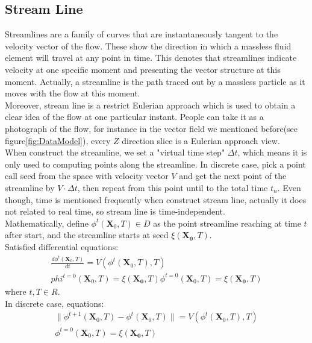 \documentclass[
     11pt,         %
     a4paper,      %
     oneside,
     ]{article}
\newcommand{\vect}[1]{\boldsymbol{#1}}
\begin{document}
	\subsection{Stream  Line}
	Streamlines are a family of curves that are instantaneously tangent to the velocity vector of the flow. These show the direction in which a massless fluid element will travel at any point in time\cite{StreamlineDefine}. This denotes that streamlines indicate velocity at one specific moment and presenting the vector structure at this moment. Actually, a streamline is the path traced out by a massless particle as it moves with the flow at this moment.\\
	Moreover, stream line is a restrict Eulerian approach which is used to obtain a clear idea of the flow at one particular instant. People can take it as a photograph of the flow, for instance in the vector field we mentioned before(see figure\ref{fig:DataModel}), every $Z$ direction slice is a Eulerian approach view.\\
	When construct the streamline, we set a "virtual time step" $\Delta t$, which means it is only used to computing points along the streamline. In discrete case, pick a point call seed from the space with velocity vector $V$ and get the next point of the streamline by $V\cdot\Delta t$, then repeat from this point until to the total time $t_{n}$. Even though, time is mentioned frequently when construct stream line, actually it does not related to real time, so stream line is time-independent.\\
	Mathematically, define $\phi^{t}(\vect{X}_{0},T)\in D$ as the point streamline reaching at time $t$ after start, and the streamline starts at seed $\xi(\vect{X_{0}},T)$. \\
	Satisfied differential equations:\\
	\begin{eqnarray}
	\frac{d\phi^{t}(\vect{X}_{0},T)}{dt}=V(\phi^{t}(\vect{X}_{0},T),T)\\
	phi^{t=0}(\vect{X}_{0},T)=\xi(\vect{X_{0}},T)
	\label{equation:Streamline1}
	\phi^{t=0}(\vect{X}_{0},T)=\xi(\vect{X_{0}},T)
	\label{equation:Streamline2}
	\end{eqnarray}
	where $t,T\in R$.\\
	In discrete case, equations:\\
	\begin{eqnarray}
	\lVert\phi^{t+1}(\vect{X}_{0},T)-\phi^{t}(\vect{X}_{0},T)\rVert=V(\phi^{t}(\vect{X}_{0},T),T)\\
	\phi^{t=0}(\vect{X}_{0},T)=\xi(\vect{X_{0}},T)
	\end{eqnarray}
\end{document}
